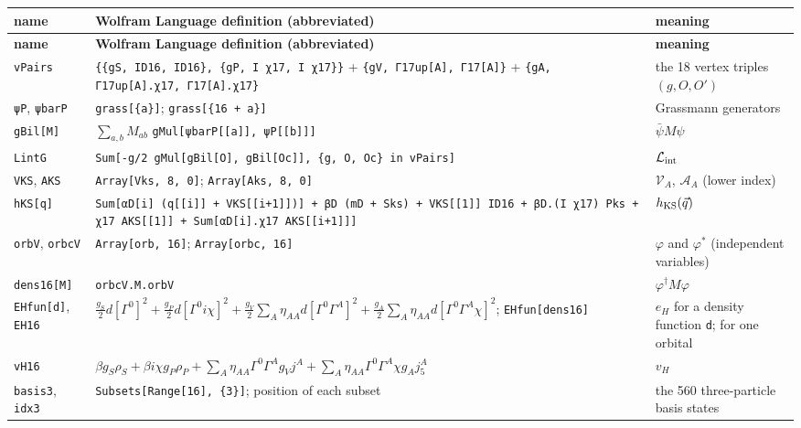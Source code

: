 \documentclass[10pt,a4paper]{article}
\begin{document}
{\footnotesize
\begin{longtable}{>{\raggedright\arraybackslash}p{}>{\raggedright\arraybackslash}p{}>{\raggedright\arraybackslash}p{}}
\toprule
\textbf{name} & \textbf{Wolfram Language definition (abbreviated)} & \textbf{meaning} \\
\midrule\endfirsthead
\toprule
\textbf{name} & \textbf{Wolfram Language definition (abbreviated)} & \textbf{meaning} \\
\midrule\endhead
\endfoot
\bottomrule\endlastfoot
\texttt{vPairs} & \texttt{\{\{gS, ID16, ID16\}, \{gP, I χ17, I χ17\}\}} + \texttt{\{gV, Γ17up[A], Γ17[A]\}} + \texttt{\{gA, Γ17up[A].χ17, Γ17[A].χ17\}} & the 18 vertex triples $(g,O,O')$ \\
\texttt{ψP}, \texttt{ψbarP} & \texttt{grass[\{a\}]}; \texttt{grass[\{16 + a\}]} & 32 Grassmann generators \\
\texttt{gBil[M]} & $\sum_{a,b}M_{ab}$ \texttt{gMul[ψbarP[[a]], ψP[[b]]]} & $\bar\psi M\psi$ \\
\texttt{LintG} & \texttt{Sum[-g/\allowbreak{}2 gMul[gBil[O], gBil[Oc]], \{g, O, Oc\} in vPairs]} & $\mathcal L_{\rm int}$ \\
\texttt{VKS}, \texttt{AKS} & \texttt{Array[Vks, 8, 0]}; \texttt{Array[Aks, 8, 0]} & $\mathcal V_A$, $\mathcal A_A$ (lower index) \\
\texttt{hKS[q]} & \texttt{Sum[αD[i] (q[[i]] + VKS[[i+1]])] + βD (mD + Sks) + VKS[[1]] ID16 + βD.(I χ17) Pks + χ17 AKS[[1]] + Sum[αD[i].χ17 AKS[[i+1]]]} & $h_{\rm KS}(\vec q)$ \\
\texttt{orbV}, \texttt{orbcV} & \texttt{Array[orb, 16]}; \texttt{Array[orbc, 16]} & $\varphi$ and $\varphi^*$ (independent variables) \\
\texttt{dens16[M]} & \texttt{orbcV.M.orbV} & $\varphi^\dagger M\varphi$ \\
\texttt{EHfun[d]}, \texttt{EH16} & $\frac{g_S}2d[\Gamma^0]^2+\frac{g_P}2d[\Gamma^0i\chi]^2+\frac{g_V}2\sum_A\eta_{AA}d[\Gamma^0\Gamma^A]^2+\frac{g_A}2\sum_A\eta_{AA}d[\Gamma^0\Gamma^A\chi]^2$; \texttt{EHfun[dens16]} & $e_H$ for a density function \texttt{d}; for one orbital \\
\texttt{vH16} & $\beta g_S\rho_S+\beta i\chi g_P\rho_P+\sum_A\eta_{AA}\Gamma^0\Gamma^Ag_Vj^A+\sum_A\eta_{AA}\Gamma^0\Gamma^A\chi g_Aj_5^A$ & $v_H$ \\
\texttt{basis3}, \texttt{idx3} & \texttt{Subsets[Range[16], \{3\}]}; position of each subset & the 560 three-particle basis states \\

\end{longtable}}
\end{document}
